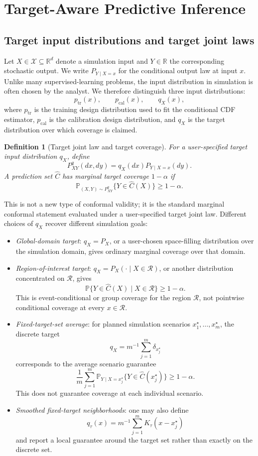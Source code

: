 \documentclass[11pt]{article}
\newtheorem{definition}{Definition}
\newcommand{\Xcal}{\mathcal X}
\newcommand{\Pp}{\mathbb P}
\newcommand{\R}{\mathbb R}
\begin{document}
\section{Target-Aware Predictive Inference}
\label{sec:target}

\subsection{Target input distributions and target joint laws}

Let \(X\in\Xcal\subseteq\R^d\) denote a simulation input and \(Y\in\R\) the corresponding stochastic output. We write \(P_{Y\mid X=x}\) for the conditional output law at input \(x\). Unlike many supervised-learning problems, the input distribution in simulation is often chosen by the analyst. We therefore distinguish three input distributions:
\[
  p_{\mathrm{tr}}(x), \qquad p_{\mathrm{cal}}(x), \qquad q_X(x),
\]
where \(p_{\mathrm{tr}}\) is the training design distribution used to fit the conditional CDF estimator, \(p_{\mathrm{cal}}\) is the calibration design distribution, and \(q_X\) is the target distribution over which coverage is claimed.

\begin{definition}[Target joint law and target coverage]
For a user-specified target input distribution \(q_X\), define
\[
  P^q_{XY}(dx,dy)=q_X(dx)P_{Y\mid X=x}(dy).
\]
A prediction set \(\widehat C\) has marginal target coverage \(1-\alpha\) if
\[
  \Pp_{(X,Y)\sim P^q_{XY}}\{Y\in \widehat C(X)\}\ge 1-\alpha .
\]
\end{definition}

This is not a new type of conformal validity; it is the standard marginal conformal statement evaluated under a user-specified target joint law. Different choices of \(q_X\) recover different simulation goals:
\begin{itemize}[leftmargin=1.7em]
  \item \emph{Global-domain target}: \(q_X=P_X\), or a user-chosen space-filling distribution over the simulation domain, gives ordinary marginal coverage over that domain.
  \item \emph{Region-of-interest target}: \(q_X=P_X(\cdot\mid X\in\mathcal R)\), or another distribution concentrated on \(\mathcal R\), gives
  \[
    \Pp\{Y\in\widehat C(X)\mid X\in\mathcal R\}\ge 1-\alpha.
  \]
  This is event-conditional or group coverage for the region \(\mathcal R\), not pointwise conditional coverage at every \(x\in\mathcal R\).
  \item \emph{Fixed-target-set average}: for planned simulation scenarios \(x_1^\star,\ldots,x_m^\star\), the discrete target
  \[
    q_X=m^{-1}\sum_{j=1}^m\delta_{x_j^\star}
  \]
  corresponds to the average scenario guarantee
  \[
    \frac{1}{m}\sum_{j=1}^m
    \Pp_{Y\mid X=x_j^\star}\{Y\in\widehat C(x_j^\star)\}\ge 1-\alpha.
  \]
  This does not guarantee coverage at each individual scenario.
  \item \emph{Smoothed fixed-target neighborhoods}: one may also define
  \[
    q_\tau(x)=m^{-1}\sum_{j=1}^m K_\tau(x-x_j^\star)
  \]
  and report a local guarantee around the target set rather than exactly on the discrete set.
\end{itemize}
\end{document}
